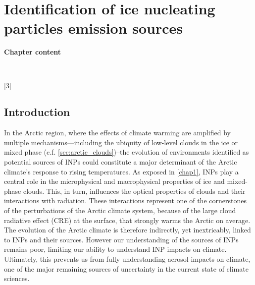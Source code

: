 \makeatother
\setcounter{counterchapter}{3}

\chapter{Identification of ice nucleating particles emission sources}
\label{chap3}




\newpage
\vspace*{\fill}
\begin{singlespace}
\textbf{Chapter content}

    
    
~

\startcontents[chapters]
[3]{}
\end{singlespace} 
\vspace*{\fill}
\newpage

\section{Introduction}
In the Arctic region, where the effects of climate warming are amplified by multiple mechanisms—including the ubiquity of low-level clouds in the ice or mixed phase (c.f. \cref{sec:arctic_clouds})\---the evolution of environments identified as potential sources of INPs could constitute a major determinant %
of the Arctic climate’s response to rising temperatures.
As exposed in \cref{chap1}, INPs play a central role in the microphysical and macrophysical properties of ice and mixed-phase clouds. This, in turn, influences the optical properties of clouds and their interactions with radiation. 
These interactions represent one of the cornerstones of the perturbations of the Arctic climate system, because of the large cloud radiative effect (CRE) at the surface, that strongly warms the Arctic on average. The evolution of the Arctic climate is therefore indirectly, yet inextricably, linked to INPs and their sources.  However our understanding of the sources of INPs remains poor, limiting our ability to understand INP impacts on climate. Ultimately, this prevents us from fully understanding aerosol impacts on climate, one of the major remaining sources of uncertainty in the current state of climate sciences. 
\vspace{\baselineskip}


